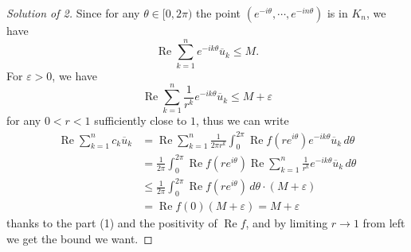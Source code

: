 \documentclass[a4paper]{article}
\theoremstyle{definition}
\renewcommand{\Re}{\operatorname{Re}}
\newcommand{\e}{\varepsilon}
\renewcommand{\bar}{\overline}
\begin{document}
\begin{proof}[Solution of 2]
Since for any $\theta\in[0,2\pi)$ the point $(e^{-i\theta},\cdots,e^{-in\theta})$ is in $K_n$, we have
\[\Re\sum_{k=1}^ne^{-ik\theta}\bar u_k\le M.\]
For $\e>0$, we have
\[\Re\sum_{k=1}^n\frac1{r^k}e^{-ik\theta}\bar u_k\le M+\e\]
for any $0<r<1$ sufficiently close to $1$, thus we can write
\begin{align*}
\Re\sum_{k=1}^nc_k\bar u_k
&=\Re\sum_{k=1}^n\frac1{2\pi r^k}\int_0^{2\pi}\Re f(re^{i\theta})e^{-ik\theta}\bar u_k\,d\theta\\
&=\frac1{2\pi}\int_0^{2\pi}\Re f(re^{i\theta})\Re\sum_{k=1}^n\frac1{r^k}e^{-ik\theta}\bar u_k\,d\theta\\
&\le\frac1{2\pi}\int_0^{2\pi}\Re f(re^{i\theta})\,d\theta\cdot(M+\e)\\
&=\Re f(0)(M+\e)=M+\e
\end{align*}
thanks to the part (1) and the positivity of $\Re f$, and by limiting $r\to1$ from left we get the bound we want.
\end{proof}
\end{document}
